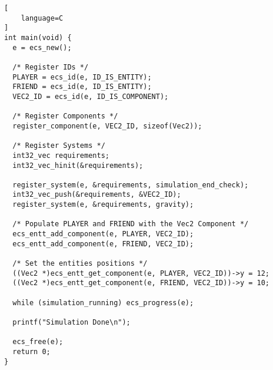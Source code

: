 \begin{lstlisting}[
    language=C
]
int main(void) {
  e = ecs_new();

  /* Register IDs */
  PLAYER = ecs_id(e, ID_IS_ENTITY);
  FRIEND = ecs_id(e, ID_IS_ENTITY);
  VEC2_ID = ecs_id(e, ID_IS_COMPONENT);

  /* Register Components */
  register_component(e, VEC2_ID, sizeof(Vec2));

  /* Register Systems */
  int32_vec requirements;
  int32_vec_hinit(&requirements);

  register_system(e, &requirements, simulation_end_check);
  int32_vec_push(&requirements, &VEC2_ID);
  register_system(e, &requirements, gravity);

  /* Populate PLAYER and FRIEND with the Vec2 Component */
  ecs_entt_add_component(e, PLAYER, VEC2_ID);
  ecs_entt_add_component(e, FRIEND, VEC2_ID);

  /* Set the entities positions */
  ((Vec2 *)ecs_entt_get_component(e, PLAYER, VEC2_ID))->y = 12;
  ((Vec2 *)ecs_entt_get_component(e, FRIEND, VEC2_ID))->y = 10;

  while (simulation_running) ecs_progress(e);

  printf("Simulation Done\n");

  ecs_free(e);
  return 0;
}
\end{lstlisting}

